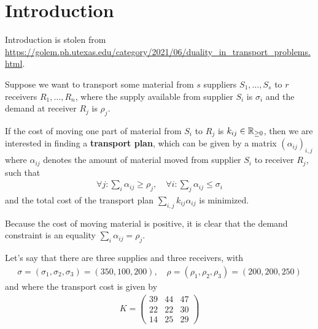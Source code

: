 \section{Introduction}

Introduction is stolen from \url{https://golem.ph.utexas.edu/category/2021/06/duality_in_transport_problems.html}.


Suppose we want to transport some material from $s$ suppliers $S_{1}, \ldots, S_{s}$ to $r$ receivers $R_{1}, \ldots, R_{n}$, where the supply available from supplier $S_i$ is $\sigma_i$ and the demand at receiver $R_j$ is $\rho_j$.


If the cost of moving one part of material from $S_i$ to $R_j$ is $k_{ij} \in \mathbb{R}_{\geq 0}$, 
then we are interested in finding a \textbf{transport plan}, which can be given by a matrix $(\alpha_{ij})_{i,j}$ where $\alpha_{ij}$ denotes the amount of material moved from supplier $S_i$ to receiver $R_j$, such that
\begin{align*}
  \forall j: \sum_{i} \alpha_{ij} \geq \rho_j, \quad \forall  i: \sum_{j} \alpha_{ij} \leq \sigma_i
\end{align*}
and the total cost of the transport plan $\sum_{i,j}k_{ij} \alpha_{ij}$ is minimized.


Because the cost of moving material is positive, it is clear that the demand constraint is an equality $\sum_{i} \alpha_{ij} = \rho_j$.


\begin{ex}[]
Let's say that there are three supplies and three receivers, with
\begin{align*}
  \sigma = (\sigma_1,\sigma_2,\sigma_3) = (350,100,200), \quad \rho = (\rho_1,\rho_2,\rho_3) = (200,200,250)
\end{align*}
and where the transport cost is given by
\begin{align*}
  K =  \begin{pmatrix}
    39 & 44 & 47\\
    22 & 22 & 30\\
    14 & 25 & 29
  \end{pmatrix}
\end{align*}
\end{ex}
